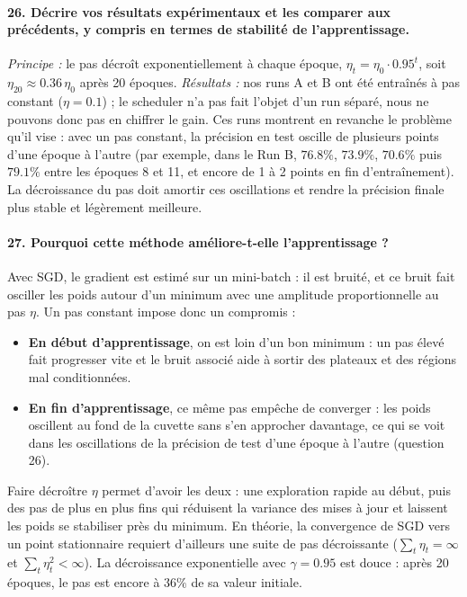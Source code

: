\documentclass{report}
\begin{document}
\paragraph{26. Décrire vos résultats expérimentaux et les comparer aux précédents, y compris en termes de stabilité de l'apprentissage.}
 \textit{Principe :} le pas décroît exponentiellement à chaque époque, $\eta_t = \eta_0 \cdot 0.95^t$, soit $\eta_{20} \approx 0.36\,\eta_0$ après 20 époques. \textit{Résultats :} nos runs A et B ont été entraînés à pas constant ($\eta = 0.1$) ; le scheduler n'a pas fait l'objet d'un run séparé, nous ne pouvons donc pas en chiffrer le gain. Ces runs montrent en revanche le problème qu'il vise : avec un pas constant, la précision en test oscille de plusieurs points d'une époque à l'autre (par exemple, dans le Run B, $76.8\%$, $73.9\%$, $70.6\%$ puis $79.1\%$ entre les époques 8 et 11, et encore de 1 à 2 points en fin d'entraînement). La décroissance du pas doit amortir ces oscillations et rendre la précision finale plus stable et légèrement meilleure.

\paragraph{27. Pourquoi cette méthode améliore-t-elle l'apprentissage ?}
 Avec SGD, le gradient est estimé sur un mini-batch : il est bruité, et ce bruit fait osciller les poids autour d'un minimum avec une amplitude proportionnelle au pas $\eta$. Un pas constant impose donc un compromis :
\begin{itemize}
    \item \textbf{En début d'apprentissage}, on est loin d'un bon minimum : un pas élevé fait progresser vite et le bruit associé aide à sortir des plateaux et des régions mal conditionnées.
    \item \textbf{En fin d'apprentissage}, ce même pas empêche de converger : les poids oscillent au fond de la cuvette sans s'en approcher davantage, ce qui se voit dans les oscillations de la précision de test d'une époque à l'autre (question 26).
\end{itemize}
Faire décroître $\eta$ permet d'avoir les deux : une exploration rapide au début, puis des pas de plus en plus fins qui réduisent la variance des mises à jour et laissent les poids se stabiliser près du minimum. En théorie, la convergence de SGD vers un point stationnaire requiert d'ailleurs une suite de pas décroissante ($\sum_t \eta_t = \infty$ et $\sum_t \eta_t^2 < \infty$). La décroissance exponentielle avec $\gamma = 0.95$ est douce : après 20 époques, le pas est encore à $36\%$ de sa valeur initiale.
\end{document}
